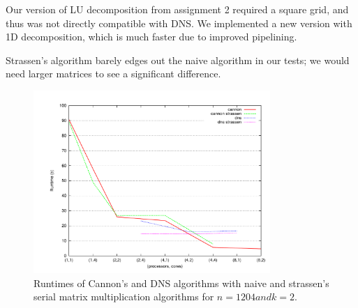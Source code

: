 \documentclass{article}
\begin{document}
Our version of LU decomposition from assignment 2 required a square grid, and thus was not directly compatible with DNS. We implemented a new version with
1D decomposition, which is much faster due to improved pipelining.

Strassen's algorithm barely edges out the naive algorithm in our tests; we would need larger matrices to see a significant difference.


\begin{figure}
	\centering
	\includegraphics[width=0.8\textwidth]{images/finished/cannon-dns-1024-2.pdf}
    \caption{Runtimes of Cannon's and DNS algorithms with naive and strassen's serial matrix multiplication algorithms for $n = 1204 and k = 2$.}
    \label{fig:cannon-dns}
\end{figure}

% 
% 
% 


\newpage
~









\end{document}
